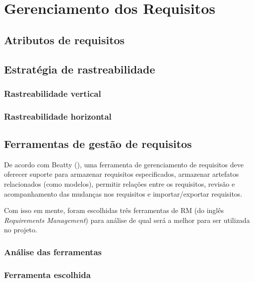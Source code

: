 \chapter[Gerenciamento dos Requisitos]{Gerenciamento dos Requisitos}

  \section{Atributos de requisitos}
  
  \section{Estratégia de rastreabilidade}
  
    \subsection{Rastreabilidade vertical}
    
    \subsection{Rastreabilidade horizontal}
    
  \section{Ferramentas de gestão de requisitos}
    
    De acordo com Beatty (\citeyear{beatty13}), uma ferramenta de gerenciamento de requisitos deve oferecer
    suporte para armazenar requisitos especificados, armazenar artefatos relacionados (como modelos), permitir relações
    entre os requisitos, revisão e acompanhamento das mudanças nos requisitos e importar/exportar requisitos.
    
    Com isso em mente, foram escolhidas três ferramentas de RM (do inglês \textit{Requirements Management}) para análise de
    qual será a melhor para ser utilizada no projeto.  
    
    \subsection{Análise das ferramentas}
    
      
    
    \subsection{Ferramenta escolhida}
      
      